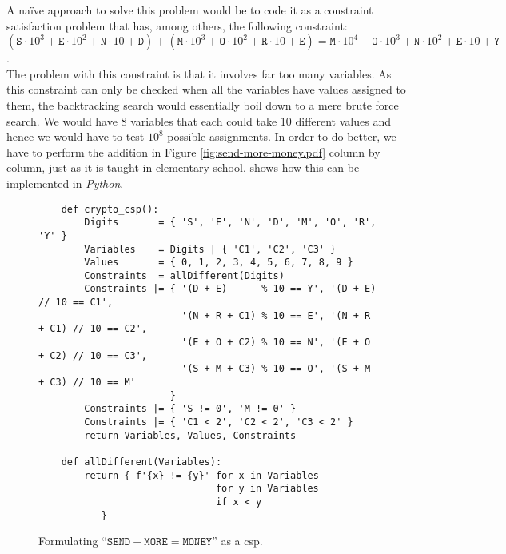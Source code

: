 \noindent
A na\"ive approach to solve this problem would be to code it as a constraint satisfaction problem that has,
among others,  the
following constraint:
\\[0.2cm]
\hspace*{0.0cm}
$   (\texttt{S} \cdot 10^3 + \texttt{E} \cdot 10^2 + \texttt{N} \cdot 10 + \texttt{D}) 
  + (\texttt{M} \cdot 10^3 + \texttt{O} \cdot 10^2 + \texttt{R} \cdot 10 + \texttt{E})
  = \texttt{M} \cdot 10^4 + \texttt{O} \cdot 10^3 + \texttt{N} \cdot 10^2 + \texttt{E} \cdot 10 + \texttt{Y}
$.
\\[0.2cm]
The problem with this constraint is that it involves far too many variables.  As this constraint can only be
checked when all the variables have values assigned to them, the backtracking search would essentially
boil down to a mere brute force search.  We would have 8 variables that each could take 10 different values and
hence we would have to test $10^{8}$ possible assignments. In order to do better, we have to perform the addition in Figure
 \ref{fig:send-more-money.pdf} column by column, just as it is taught in elementary school.
  shows how this can be implemented in \textsl{Python}.

\begin{figure}[!ht]
\centering
\begin{verbatim}
    def crypto_csp():
        Digits       = { 'S', 'E', 'N', 'D', 'M', 'O', 'R', 'Y' }
        Variables    = Digits | { 'C1', 'C2', 'C3' }
        Values       = { 0, 1, 2, 3, 4, 5, 6, 7, 8, 9 }
        Constraints  = allDifferent(Digits)
        Constraints |= { '(D + E)      % 10 == Y', '(D + E)      // 10 == C1',
                         '(N + R + C1) % 10 == E', '(N + R + C1) // 10 == C2',
                         '(E + O + C2) % 10 == N', '(E + O + C2) // 10 == C3',
                         '(S + M + C3) % 10 == O', '(S + M + C3) // 10 == M'
                       }
        Constraints |= { 'S != 0', 'M != 0' }
        Constraints |= { 'C1 < 2', 'C2 < 2', 'C3 < 2' }
        return Variables, Values, Constraints
    
    def allDifferent(Variables):
        return { f'{x} != {y}' for x in Variables
                               for y in Variables 
                               if x < y 
           }
\end{verbatim}
\vspace*{-0.3cm}
\caption{Formulating ``$\texttt{SEND} + \texttt{MORE} = \texttt{MONEY}$'' as a \ac{csp}.}
\label{fig:Crypto-Arithmetic.ipynb}
\end{figure}


